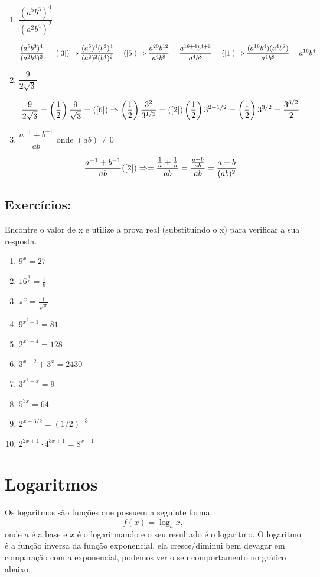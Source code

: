 \documentclass[10pt,a4paper]{article}
\begin{document}
	 \begin{enumerate}
	 	\item $ \dfrac{(a^5b^3)^4}{(a^2b^4)^2} $
	 	
	 	$$ \dfrac{(a^5b^3)^4}{(a^2b^4)^2} \text{  }= (\ref{3}) \Rightarrow \dfrac{(a^5)^4(b^3)^4}{(a^2)^2(b^4)^2}= (\ref{5}) \Rightarrow \dfrac{a^{20}b^{12}}{a^4b^8} = \dfrac{a^{16+4}b^{4+8}}{a^4b^8}= (\ref{1}) \Rightarrow \dfrac{(a^{16}b^4)(a^4b^8)}{a^4b^8} = a^{16}b^4$$
	 	
	 	\item $\dfrac{9}{2\sqrt{3}}$
	 	
	 	$$\dfrac{9}{2\sqrt{3}} = \left(\dfrac{1}{2}\right) \dfrac{9}{\sqrt{3}} = (\ref{6}) \Rightarrow \left(\dfrac{1}{2}\right) \dfrac{3^2}{3^{1/2}} = (\ref{2})  \left(\dfrac{1}{2}\right)3^{2-1/2} = \left(\dfrac{1}{2}\right)3^{3/2} = \dfrac{3^{3/2}}{2}$$
	 	
	 	\item $ \dfrac{a^{-1} + b^{-1}}{ab} $ onde $ (ab) \neq 0$
	 	
	 	$$ \dfrac{a^{-1} + b^{-1}}{ab} (\ref{2}) \Rightarrow = \dfrac{\frac{1}{a} + \frac{1}{b}}{ab} = \dfrac{\frac{a+b}{ab}}{ab}  = \dfrac{a+b}{(ab)^2}$$
	 	
	 \end{enumerate}
 
 	\subsection{Exercícios:}
 	Encontre o valor de x e utilize a prova real (substituindo o x) para verificar a sua resposta.
 	\begin{enumerate}
 		\item $ 9^x = 27 $
 		\item $ 16^{\frac{3}{x}} = \frac{1}{8}$
 		\item $ \pi^x = \frac{1}{\sqrt{\pi}} $
 		\item $ 9^{x^2+1} = 81 $
 		\item $ 2^{x^2 -4} = 128 $
 		\item $ 3^{x+2} + 3^x  = 2430 $
 		\item $ 3^{x^2-x} = 9 $
 		\item $ 5^{3x} = 64 $
 		\item $ 2^{x+3/2} = (1/2)^{-3} $
 		\item $ 2^{2x+1} \cdot 4^{3x+1} = 8^{x-1} $
 	\end{enumerate}
 	
	\section{Logaritmos}
	Os logaritmos são funções que possuem a seguinte forma
	\begin{equation}\nonumber
		f(x) = \log_a x,
	\end{equation}
	onde $ a $ é a base e $ x $ é o logaritmando e o seu resultado é o logaritmo.
	O logaritmo é a função inversa da função exponencial, ela cresce/diminui bem devagar em comparação com a exponencial, podemos ver o seu comportamento no gráfico abaixo.
	
\end{document}
